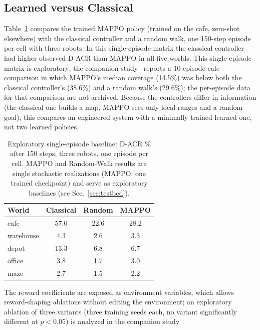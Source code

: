 \documentclass[conference]{IEEEtran}
\begin{document}
\subsection{Learned versus Classical}
Table~\ref{tab:mx} compares the trained MAPPO policy (trained on the cafe,
zero-shot elsewhere) with the classical controller and a random walk, one
150-step episode per cell with three robots. In this single-episode matrix the classical controller had higher observed D-ACR than MAPPO in all five worlds. This single-episode matrix is exploratory;
the companion study~\cite{pandhe2026mappo} reports a 10-episode cafe
comparison in which MAPPO's median coverage (14.5\%) was below both the
classical controller's (38.6\%) and a random walk's (29.6\%); the
per-episode data for that comparison are not archived.
Because the controllers differ in information (the classical one builds a map,
MAPPO sees only local ranges and a random goal), this compares an engineered
system with a minimally trained learned one, not two learned policies.

\begin{table}[t]
\centering
\caption{Exploratory single-episode baseline: D-ACR \% after 150 steps, three robots, one episode per cell. MAPPO and Random-Walk results are single stochastic realizations (MAPPO: one trained checkpoint) and serve as exploratory baselines (see Sec.~\ref{sec:testbed}).}
\label{tab:mx}
\footnotesize
\begin{tabular}{@{}lccc@{}}
\toprule
World & Classical & Random & MAPPO \\
\midrule
cafe & 57.0 & 22.6 & 28.2 \\
warehouse & 4.3 & 2.6 & 3.3 \\
depot & 13.3 & 6.8 & 6.7 \\
office & 3.8 & 1.7 & 3.0 \\
maze & 2.7 & 1.5 & 2.2 \\
\bottomrule
\end{tabular}
\end{table}

The reward coefficients are exposed as environment variables, which allows reward-shaping ablations without editing the environment; an exploratory ablation of three variants (three training seeds each, no variant significantly different at $p<0.05$) is analyzed in the companion study~\cite{pandhe2026mappo}.
\end{document}

